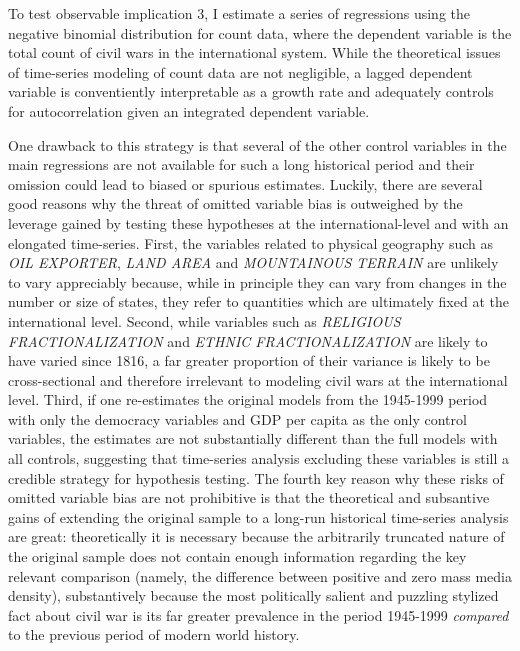 \documentclass[11pt,article,oneside]{memoir}
\begin{document}
To test observable implication 3, I estimate a series of regressions
using the negative binomial distribution for count data, where the
dependent variable is the total count of civil wars in the international
system. While the theoretical issues of time-series modeling of count
data are not negligible, a lagged dependent variable is conventiently
interpretable as a growth rate and adequately controls for
autocorrelation given an integrated dependent variable.

One drawback to this strategy is that several of the other control
variables in the main regressions are not available for such a long
historical period and their omission could lead to biased or spurious
estimates. Luckily, there are several good reasons why the threat of
omitted variable bias is outweighed by the leverage gained by testing
these hypotheses at the international-level and with an elongated
time-series. First, the variables related to physical geography such as
\emph{OIL EXPORTER}, \emph{LAND AREA} and \emph{MOUNTAINOUS TERRAIN} are
unlikely to vary appreciably because, while in principle they can vary
from changes in the number or size of states, they refer to quantities
which are ultimately fixed at the international level. Second, while
variables such as \emph{RELIGIOUS FRACTIONALIZATION} and \emph{ETHNIC
FRACTIONALIZATION} are likely to have varied since 1816, a far greater
proportion of their variance is likely to be cross-sectional and
therefore irrelevant to modeling civil wars at the international level.
Third, if one re-estimates the original models from the 1945-1999 period
with only the democracy variables and GDP per capita as the only control
variables, the estimates are not substantially different than the full
models with all controls, suggesting that time-series analysis excluding
these variables is still a credible strategy for hypothesis testing. The
fourth key reason why these risks of omitted variable bias are not
prohibitive is that the theoretical and subsantive gains of extending
the original sample to a long-run historical time-series analysis are
great: theoretically it is necessary because the arbitrarily truncated
nature of the original sample does not contain enough information
regarding the key relevant comparison (namely, the difference between
positive and zero mass media density), substantively because the most
politically salient and puzzling stylized fact about civil war is its
far greater prevalence in the period 1945-1999 \emph{compared} to the
previous period of modern world history.
\end{document}
